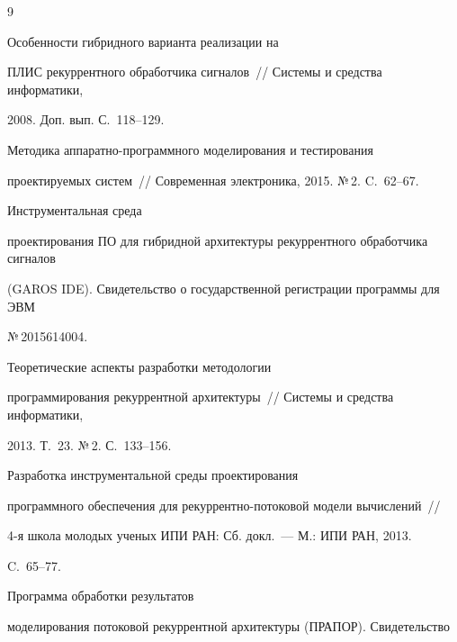 {\small\frenchspacing

{%


\begin{thebibliography}{9}


 Особенности гибридного варианта реализации на 

ПЛИС рекуррентного обработчика сигналов~/\!\!/ Системы и средства информатики, 

 2008. Доп. вып. С.~118--129.


 Методика аппаратно-программного моделирования и тестирования 

проектируемых систем~/\!\!/ Современная электроника, 2015. №\,2. C.~62--67.


 Инструментальная среда 

проектирования ПО для гибридной архитектуры рекуррентного обработчика сигналов 

(GAROS IDE). Свидетельство о государственной регистрации программы для ЭВМ 

№\,2015614004.


 Теоретические аспекты разработки методологии 

программирования рекуррентной архитектуры~/\!\!/ Системы и средства информатики, 

2013. Т.~23. №\,2. С.~133--156.


 Разработка инструментальной среды проектирования 

программного обеспечения для рекуррентно-потоковой модели вычислений~/\!\!/ 

4-я школа молодых ученых ИПИ РАН: Сб. докл.~--- М.: ИПИ РАН, 2013. 

C.~65--77.


 Программа обработки результатов 

моделирования потоковой рекуррентной архитектуры (ПРАПОР). Свидетельство 


\end{thebibliography}}}
